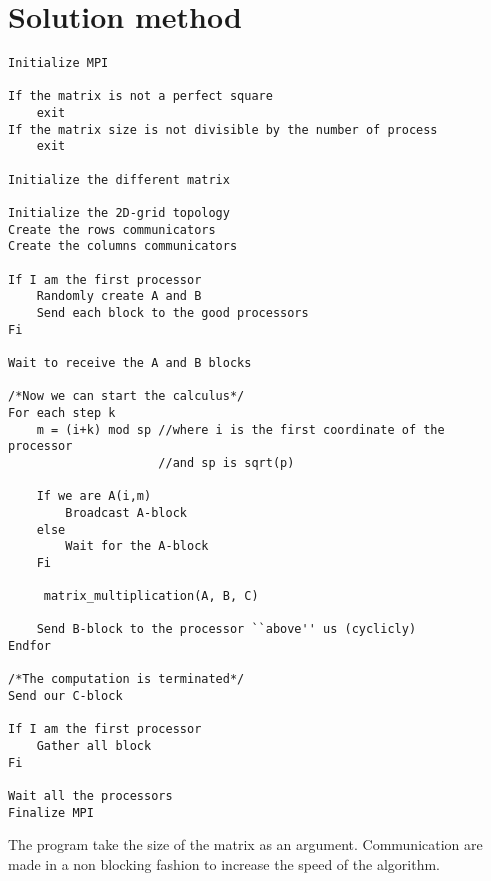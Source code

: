 \chapter{Solution method}

\begin{verbatim}
Initialize MPI

If the matrix is not a perfect square
    exit
If the matrix size is not divisible by the number of process
    exit 

Initialize the different matrix

Initialize the 2D-grid topology
Create the rows communicators
Create the columns communicators

If I am the first processor
    Randomly create A and B
    Send each block to the good processors
Fi

Wait to receive the A and B blocks

/*Now we can start the calculus*/
For each step k
    m = (i+k) mod sp //where i is the first coordinate of the processor
                     //and sp is sqrt(p)
   
    If we are A(i,m)
        Broadcast A-block
    else
        Wait for the A-block
    Fi

	 matrix_multiplication(A, B, C)

    Send B-block to the processor ``above'' us (cyclicly)
Endfor

/*The computation is terminated*/
Send our C-block

If I am the first processor
    Gather all block
Fi

Wait all the processors
Finalize MPI
\end{verbatim}

The program take the size of the matrix as an argument.
Communication are made in a non blocking fashion to increase the speed of the algorithm.
